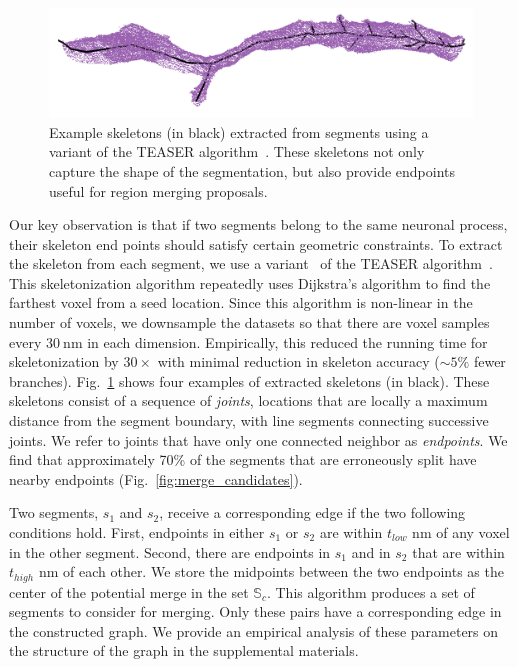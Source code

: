 \begin{figure}[t]
\begin{minipage}{0.45\linewidth}
	\end{minipage}
	\hfill
	\begin{minipage}{0.45\linewidth}
		\includegraphics[width=\linewidth]{./figures/skeleton4.png}		
	\end{minipage}
	\caption{Example skeletons (in black) extracted from segments using a variant of the TEASER algorithm~\cite{sato2000teasar}. These skeletons not only capture the shape of the segmentation, but also provide endpoints useful for region merging proposals.}
	\label{fig:skeletonization}
\end{figure}

Our key observation is that if two segments belong to the same neuronal process, their skeleton end points should satisfy certain geometric constraints.
To extract the skeleton from each segment, we use a variant~\cite{zhao2014automatic} of the TEASER algorithm~\cite{sato2000teasar}. 
This skeletonization algorithm repeatedly uses Dijkstra's algorithm to find the farthest voxel from a seed location. 
Since this algorithm is non-linear in the number of voxels, we downsample the datasets so that there are voxel samples every $\SI{30}{\nano\meter}$ in each dimension.
Empirically, this reduced the running time for skeletonization by $30\times$ with minimal reduction in skeleton accuracy (${\sim}5\%$ fewer branches). 
Fig.~\ref{fig:skeletonization} shows four examples of extracted skeletons (in black). 
These skeletons consist of a sequence of \textit{joints}, locations that are locally a maximum distance from the segment boundary, with line segments connecting successive joints. 
We refer to joints that have only one connected neighbor as \textit{endpoints}. 
We find that approximately 70\% of the segments that are erroneously split have nearby endpoints (Fig.~\ref{fig:merge_candidates}). 

Two segments, $s_1$ and $s_2$, receive a corresponding edge if the two following conditions hold.
First, endpoints in either $s_1$ or $s_2$ are within $t_{low}$ nm of any voxel in the other segment.
Second, there are endpoints in $s_1$ and in $s_2$ that are within $t_{high}$ nm of each other.
We store the midpoints between the two endpoints as the center of the potential merge in the set $\mathbb{S}_c$. 
This algorithm produces a set of segments to consider for merging. 
Only these pairs have a corresponding edge in the constructed graph.
We provide an empirical analysis of these parameters on the structure of the graph in the supplemental materials.

